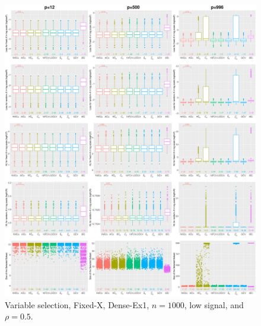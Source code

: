 \begin{figure}[!ht]
\centering
\includegraphics[width=\textwidth]{figures/supplement/fixedx/subset_selection/Dense-Ex1_n1000_lsnr_rho05.eps}
\caption{Variable selection, Fixed-X, Dense-Ex1, $n=1000$, low signal, and $\rho=0.5$.}
\end{figure}
\clearpage
